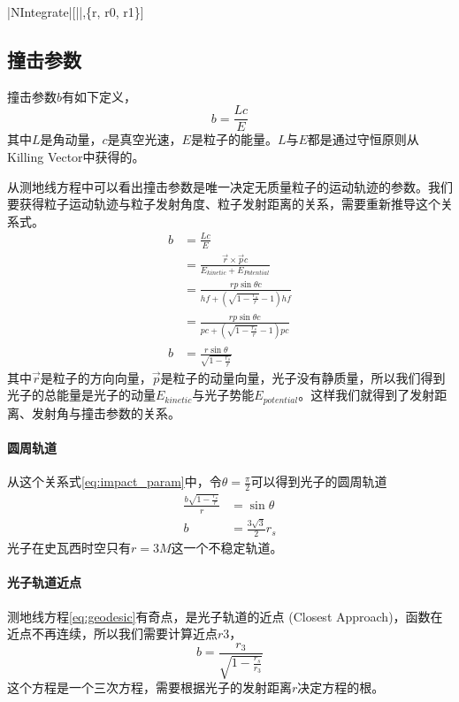 \begin{mma}
    \In |NIntegrate|[||,\{r, r0, r1\}] \\
\end{mma}
\subsection{撞击参数}
撞击参数$b$有如下定义，
\begin{equation}
    b=\frac{Lc}{E}
\end{equation}
其中$L$是角动量，$c$是真空光速，$E$是粒子的能量。$L$与$E$都是通过守恒原则从Killing Vector中获得的。

从测地线方程中可以看出撞击参数是唯一决定无质量粒子的运动轨迹的参数。我们要获得粒子运动轨迹与粒子发射角度、粒子发射距离的关系，需要重新推导这个关系式。
\begin{equation}
    \begin{split}
        b&=\frac{Lc}{E}\\&=\frac{\vec{r}\times\vec{p}c}{E_{kinetic}+E_{Potential}}\\&=\frac{rp\sin\theta c}{hf+\left(\sqrt{1-\frac{r_{s}}{r}}-1\right)hf}\\&=\frac{rp\sin\theta c}{pc+\left(\sqrt{1-\frac{r_{s}}{r}}-1\right)pc}\\b&=\frac{r\sin\theta}{\sqrt{1-\frac{r_{s}}{r}}}\label{eq:impact_param}
    \end{split}
\end{equation}
其中$\vec{r}$是粒子的方向向量，$\vec{p}$是粒子的动量向量，光子没有静质量，所以我们得到光子的总能量是光子的动量$E_{kinetic}$与光子势能$E_{potential}$。这样我们就得到了发射距离、发射角与撞击参数的关系。

\paragraph{圆周轨道}
从这个关系式\eqref{eq:impact_param}中，令$\theta=\frac{\pi}{2}$可以得到光子的圆周轨道
\begin{equation*}
    \begin{split}
        \frac{b\sqrt{1-\frac{r_{s}}{r}}}{r}&=\sin\theta\\
        b&=\frac{3\sqrt{3}}{2}r_{s}
    \end{split}
\end{equation*}
光子在史瓦西时空只有$r=3M$这一个不稳定轨道。

\paragraph{光子轨道近点}
测地线方程\eqref{eq:geodesic}有奇点，是光子轨道的近点 (Closest Approach)，函数在近点不再连续，所以我们需要计算近点$r3$，
\begin{equation}
    b=\frac{r_3}{\sqrt{1-\frac{r_s}{r_3}}}\label{eq:r3}
\end{equation}
这个方程是一个三次方程，需要根据光子的发射距离$r$决定方程的根。

